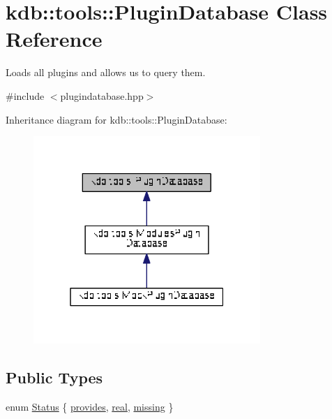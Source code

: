 \hypertarget{classkdb_1_1tools_1_1PluginDatabase}{}\section{kdb\+:\+:tools\+:\+:Plugin\+Database Class Reference}
\label{classkdb_1_1tools_1_1PluginDatabase}


Loads all plugins and allows us to query them.  




{\ttfamily \#include $<$plugindatabase.\+hpp$>$}



Inheritance diagram for kdb\+:\+:tools\+:\+:Plugin\+Database\+:
\nopagebreak
\begin{figure}[H]
\begin{center}
\leavevmode
\includegraphics[width=244pt]{classkdb_1_1tools_1_1PluginDatabase__inherit__graph}
\end{center}
\end{figure}
\subsection*{Public Types}
\begin{DoxyCompactItemize}
\item 
enum \hyperlink{classkdb_1_1tools_1_1PluginDatabase_afc91ff760616ee83c6afb70e5a2f0601}{Status} \{ \hyperlink{classkdb_1_1tools_1_1PluginDatabase_afc91ff760616ee83c6afb70e5a2f0601a73ff10d6a07213c277db4326b3df6c4b}{provides}, 
\hyperlink{classkdb_1_1tools_1_1PluginDatabase_afc91ff760616ee83c6afb70e5a2f0601a2b7279a50ed80231a60b0435340c31a8}{real}, 
\hyperlink{classkdb_1_1tools_1_1PluginDatabase_afc91ff760616ee83c6afb70e5a2f0601ae789aaff1847ebb77eecb027c5ee0401}{missing}
 \}
\end{DoxyCompactItemize}
